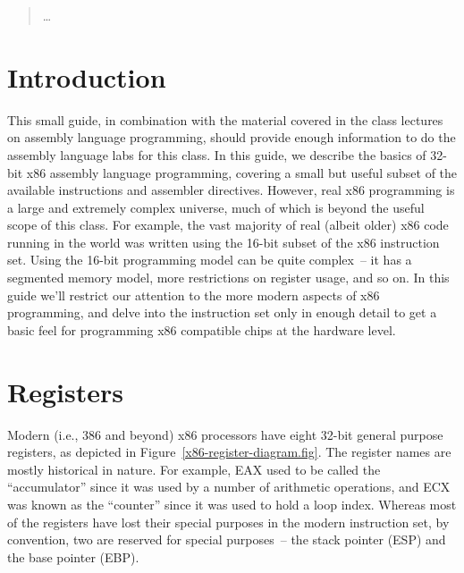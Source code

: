 \newcommand{\asminstructionsummary}[7]{
\noindent\begin{tabular}{p{1in}p{#6}p{#7}}
\multicolumn{3}{p{6.7in}}{\bf Instruction: #1} \\
\em Syntax: & \multicolumn{2}{p{5.7in}}{\tt #2} \\
\em Semantics: & \multicolumn{2}{p{5.7in}}{#3} \\
\em Examples: & \tt #4 & \tt #5 \\
\end{tabular}
}


\begin{quotation}
\ldots
\end{quotation}


\section{Introduction}

This small guide, in combination with the material covered in the
class lectures on assembly language programming, should provide enough
information to do the assembly language labs for this class. In this
guide, we describe the basics of 32-bit x86 assembly language
programming, covering a small but useful subset of the available
instructions and assembler directives. However, real x86 programming
is a large and extremely complex universe, much of which is beyond the
useful scope of this class. For example, the vast majority of real
(albeit older) x86 code running in the world was written using the
16-bit subset of the x86 instruction set. Using the 16-bit programming
model can be quite complex~-- it has a segmented memory model, more
restrictions on register usage, and so on. In this guide we'll
restrict our attention to the more modern aspects of x86 programming,
and delve into the instruction set only in enough detail to get a
basic feel for programming x86 compatible chips at the hardware level.

\section{Registers}

Modern (i.e., 386 and beyond) x86 processors have eight 32-bit general
purpose registers, as depicted in
Figure~\ref{x86-register-diagram.fig}. The register names are mostly
historical in nature. For example, EAX used to be called the
``accumulator'' since it was used by a number of arithmetic
operations, and ECX was known as the ``counter'' since it was used to
hold a loop index. Whereas most of the registers have lost their
special purposes in the modern instruction set, by convention, two are
reserved for special purposes~-- the stack pointer (ESP) and the base
pointer (EBP).

